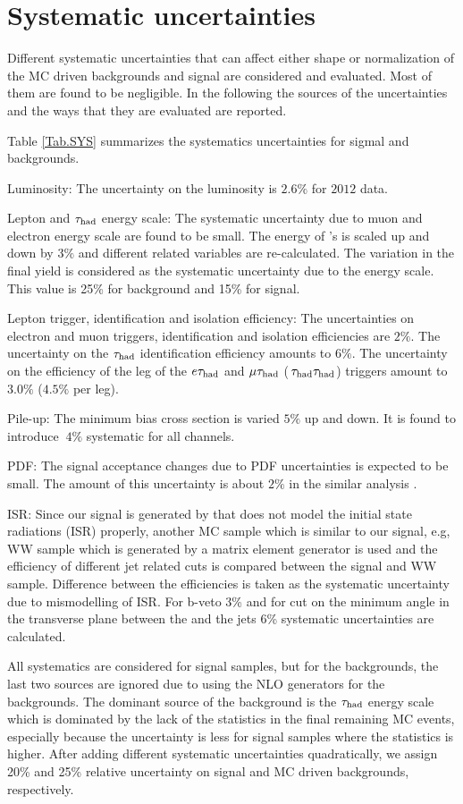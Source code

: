 \section{Systematic uncertainties}
\label{sect:sys}
Different systematic uncertainties that can affect either shape or normalization of the MC driven backgrounds
and signal are considered and evaluated.
Most of them are found to be negligible. In the following the sources of the uncertainties and the ways that they are evaluated are reported. 

Table \ref{Tab.SYS} summarizes the systematics uncertainties for sigmal and backgrounds.


 Luminosity: The uncertainty on the luminosity  is $2.6\%$ for $2012$ data.
 
 Lepton and $\tau_{\rm had}$ energy scale: The systematic uncertainty due to muon and electron energy scale are found to be small.
The energy of \hadtau's is scaled up and down by $3\%$ and different \Tau related variables are re-calculated.  The variation in the final yield is considered as the
systematic uncertainty due to the \Tau energy scale. This value is 25\% for background and 15\% for signal.

 Lepton trigger, identification and isolation efficiency: The uncertainties on electron and muon triggers, identification and isolation efficiencies are $2\%$. 
The uncertainty on the $\tau_{\rm had}$ identification efficiency amounts to $6\%$. 
The uncertainty on the efficiency of the \Tau leg of the $e\tau_{\rm had}$ and $\mu\tau_{\rm had}$ ($\,\tau_{\rm had}\tau_{\rm had}$) triggers amount to $3.0\%$ ($4.5\%$ per leg).

 Pile-up: The minimum bias cross section is varied $5 \%$ up and down. It is found to introduce $~4 \%$ systematic for all channels.    

 PDF: The signal acceptance changes due to PDF uncertainties is expected to be small. 
The amount of this uncertainty is about $2\%$ in the similar analysis \cite{Khachatryan:2014qwa}.

ISR: Since our signal is generated by \PYTHIA that does not  model the initial state radiations (ISR) properly, another MC sample which is similar to our signal, e.g, WW sample 
which is generated by a matrix element generator is used and the efficiency of different jet related cuts is compared between the signal and WW sample. Difference between the
efficiencies is taken as the systematic uncertainty due to mismodelling of ISR. For b-veto 3\% and for cut on   the minimum angle in the transverse plane between 
the \MET and the jets 6\% systematic uncertainties are  calculated.  

All systematics are considered for signal samples, but for the backgrounds, the last two sources are ignored due to using the NLO generators 
for the backgrounds. The dominant source of the background is the $\tau_{\rm had}$ energy scale which is dominated by the lack of the statistics in the 
final remaining MC events, especially because the uncertainty is less for signal samples where the statistics is higher. 
After adding different systematic uncertainties quadratically, 
we assign 20\% and 25\% relative uncertainty on signal and MC driven backgrounds, respectively.

